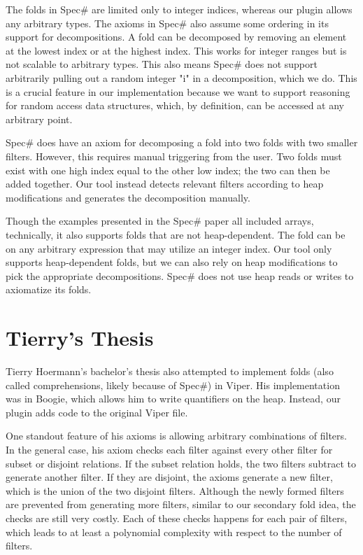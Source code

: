 \documentclass[msc,oneside]{ubcthesis}
\theoremstyle{definition}
\begin{document}
The folds in Spec\# are limited only to integer indices, whereas our plugin allows any arbitrary types. The axioms in Spec\# also assume some ordering in its support for decompositions. A fold can be decomposed by removing an element at the lowest index or at the highest index. This works for integer ranges but is not scalable to arbitrary types. This also means Spec\# does not support arbitrarily pulling out a random integer "i" in a decomposition, which we do. This is a crucial feature in our implementation because we want to support reasoning for random access data structures, which, by definition, can be accessed at any arbitrary point.

Spec\# does have an axiom for decomposing a fold into two folds with two smaller filters. However, this requires manual triggering from the user. Two folds must exist with one high index equal to the other low index; the two can then be added together. Our tool instead detects relevant filters according to heap modifications and generates the decomposition manually.    

Though the examples presented in the Spec\# paper all included arrays, technically, it also supports folds that are not heap-dependent. The fold can be on any arbitrary expression that may utilize an integer index. Our tool only supports heap-dependent folds, but we can also rely on heap modifications to pick the appropriate decompositions. Spec\# does not use heap reads or writes to axiomatize its folds.

\section{Tierry's Thesis}
Tierry Hoermann's bachelor’s thesis also attempted to implement folds (also called comprehensions, likely because of Spec\#) in Viper. His implementation was in Boogie, which allows him to write quantifiers on the heap. Instead, our plugin adds code to the original Viper file. 

One standout feature of his axioms is allowing arbitrary combinations of filters. In the general case, his axiom checks each filter against every other filter for subset or disjoint relations. If the subset relation holds, the two filters subtract to generate another filter. If they are disjoint, the axioms generate a new filter, which is the union of the two disjoint filters. Although the newly formed filters are prevented from generating more filters, similar to our secondary fold idea, the checks are still very costly. Each of these checks happens for each pair of filters, which leads to at least a polynomial complexity with respect to the number of filters.
\end{document}
